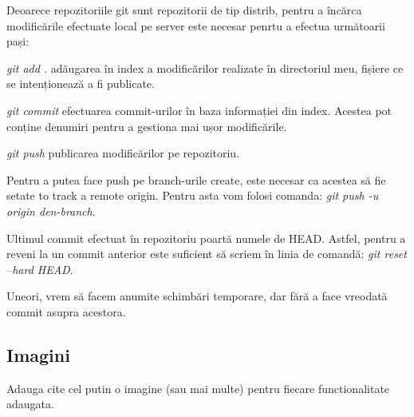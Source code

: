 	Deoarece repozitoriile git sunt repozitorii de tip distrib, pentru a încărca modificările efectuate local pe server este necesar penrtu a efectua următoarii pași:
	\begin{list}{•}
	\item  \textit{git add .} adăugarea în index a modificărilor realizate în directoriul meu, fișiere ce se intenționează a fi publicate.
	\item \textit{git commit} efectuarea commit-urilor în baza informației din index. Acestea pot conține denumiri pentru a gestiona mai ușor modificările.
	\item \textit{git push} publicarea modificărilor pe repozitoriu.
	\end{list}
	
	Pentru a putea face push pe branch-urile create, este necesar ca acestea să fie setate to track a remote origin. Pentru asta vom folosi comanda: \textit{git push -u origin den-branch}. 
	
	Ultimul commit efectuat în repozitoriu poartă numele de HEAD. Astfel, pentru a reveni la un commit anterior este suficient să scriem în linia de comandă: \textit{git reset --hard HEAD}.
	
	Uneori, vrem să facem anumite schimbări temporare, dar fără a face vreodată commit asupra acestora.
	
\subsection{Imagini}

Adauga cite cel putin o imagine (sau mai multe) pentru fiecare functionalitate adaugata.

\clearpage